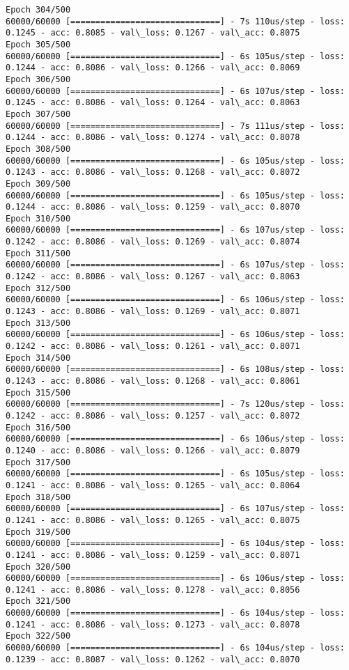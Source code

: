 \documentclass[11pt]{article}
\begin{document}
\begin{Verbatim}[commandchars=\\\{\}]
Epoch 304/500
60000/60000 [==============================] - 7s 110us/step - loss: 0.1245 - acc: 0.8085 - val\_loss: 0.1267 - val\_acc: 0.8075
Epoch 305/500
60000/60000 [==============================] - 6s 105us/step - loss: 0.1244 - acc: 0.8086 - val\_loss: 0.1266 - val\_acc: 0.8069
Epoch 306/500
60000/60000 [==============================] - 6s 107us/step - loss: 0.1245 - acc: 0.8086 - val\_loss: 0.1264 - val\_acc: 0.8063
Epoch 307/500
60000/60000 [==============================] - 7s 111us/step - loss: 0.1244 - acc: 0.8086 - val\_loss: 0.1274 - val\_acc: 0.8078
Epoch 308/500
60000/60000 [==============================] - 6s 105us/step - loss: 0.1243 - acc: 0.8086 - val\_loss: 0.1268 - val\_acc: 0.8072
Epoch 309/500
60000/60000 [==============================] - 6s 105us/step - loss: 0.1244 - acc: 0.8086 - val\_loss: 0.1259 - val\_acc: 0.8070
Epoch 310/500
60000/60000 [==============================] - 6s 107us/step - loss: 0.1242 - acc: 0.8086 - val\_loss: 0.1269 - val\_acc: 0.8074
Epoch 311/500
60000/60000 [==============================] - 6s 107us/step - loss: 0.1242 - acc: 0.8086 - val\_loss: 0.1267 - val\_acc: 0.8063
Epoch 312/500
60000/60000 [==============================] - 6s 106us/step - loss: 0.1243 - acc: 0.8086 - val\_loss: 0.1269 - val\_acc: 0.8071
Epoch 313/500
60000/60000 [==============================] - 6s 106us/step - loss: 0.1242 - acc: 0.8086 - val\_loss: 0.1261 - val\_acc: 0.8071
Epoch 314/500
60000/60000 [==============================] - 6s 108us/step - loss: 0.1243 - acc: 0.8086 - val\_loss: 0.1268 - val\_acc: 0.8061
Epoch 315/500
60000/60000 [==============================] - 7s 120us/step - loss: 0.1242 - acc: 0.8086 - val\_loss: 0.1257 - val\_acc: 0.8072
Epoch 316/500
60000/60000 [==============================] - 6s 106us/step - loss: 0.1240 - acc: 0.8086 - val\_loss: 0.1266 - val\_acc: 0.8079
Epoch 317/500
60000/60000 [==============================] - 6s 105us/step - loss: 0.1241 - acc: 0.8086 - val\_loss: 0.1265 - val\_acc: 0.8064
Epoch 318/500
60000/60000 [==============================] - 6s 107us/step - loss: 0.1241 - acc: 0.8086 - val\_loss: 0.1265 - val\_acc: 0.8075
Epoch 319/500
60000/60000 [==============================] - 6s 104us/step - loss: 0.1241 - acc: 0.8086 - val\_loss: 0.1259 - val\_acc: 0.8071
Epoch 320/500
60000/60000 [==============================] - 6s 106us/step - loss: 0.1241 - acc: 0.8086 - val\_loss: 0.1278 - val\_acc: 0.8056
Epoch 321/500
60000/60000 [==============================] - 6s 104us/step - loss: 0.1241 - acc: 0.8086 - val\_loss: 0.1273 - val\_acc: 0.8078
Epoch 322/500
60000/60000 [==============================] - 6s 104us/step - loss: 0.1239 - acc: 0.8087 - val\_loss: 0.1262 - val\_acc: 0.8070

\end{Verbatim}
\end{document}
